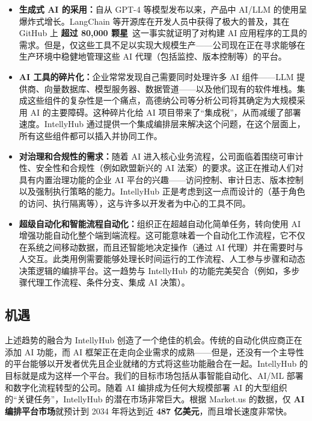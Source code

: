 \documentclass[11pt, a4paper, oneside]{article}
\begin{document}
\begin{itemize}
    \item \textbf{生成式 AI 的采用：}自从 GPT-4 等模型发布以来，产品中 AI/LLM 的使用呈爆炸式增长。LangChain 等开源库在开发人员中获得了极大的普及，其在 GitHub 上 \textbf{超过 80,000 颗星}~\cite{langchainGitHub}这一事实就证明了对构建 AI 应用程序的工具的需求。但是，仅这些工具不足以实现大规模生产——公司现在正在寻求能够在生产环境中稳健地管理这些 AI 代理（包括监控、版本控制等）的平台。

    \item \textbf{AI 工具的碎片化：}企业常常发现自己需要同时处理许多 AI 组件——LLM 提供商、向量数据库、模型服务器、数据管道——以及他们现有的软件堆栈。集成这些组件的复杂性是一个痛点，高德纳公司等分析公司将其确定为大规模采用 AI 的主要障碍\cite{gartnerAIBarriers}。这种碎片化给 AI 项目带来了“集成税”，从而减缓了部署速度。IntellyHub 通过提供一个集成编排层来解决这个问题，在这个层面上，所有这些组件都可以插入并协同工作。

    \item \textbf{对治理和合规性的需求：}随着 AI 进入核心业务流程，公司面临着围绕可审计性、安全性和合规性（例如欧盟新兴的 AI 法案\cite{euAIAct}）的要求。这正在推动人们对具有内置治理功能的企业 AI 平台的兴趣——访问控制、审计日志、版本控制以及强制执行策略的能力。IntellyHub 正是考虑到这一点而设计的（基于角色的访问、执行隔离等），这与许多以开发者为中心的工具不同。

    \item \textbf{超级自动化和智能流程自动化：}组织正在超越自动化简单任务，转向使用 AI 增强功能自动化整个端到端流程。这可能意味着一个自动化工作流程，它不仅在系统之间移动数据，而且还智能地决定操作（通过 AI 代理）并在需要时与人交互。此类用例需要能够处理长时间运行的工作流程、人工参与步骤和动态决策逻辑的编排平台。这一趋势与 IntellyHub 的功能完美契合（例如，多步骤代理工作流程、条件分支、集成 AI 决策）。
\end{itemize}

\subsection{机遇}

上述趋势的融合为 IntellyHub 创造了一个绝佳的机会。传统的自动化供应商正在添加 AI 功能，而 AI 框架正在走向企业需求的成熟——但是，还没有一个主导性的平台能够以开发者优先且企业就绪的方式将这些功能融合在一起。IntellyHub 的目标就是成为这样一个平台。我们的目标市场包括从事智能自动化、AI/ML 部署和数字化流程转型的公司。随着 AI 编排成为任何大规模部署 AI 的大型组织的“关键任务”，IntellyHub 的潜在市场非常巨大。根据 Market.us 的数据，仅 \textbf{AI 编排平台市场}就预计到 2034 年将达到近 \textbf{487 亿美元}\cite{AIOrch}，而且增长速度非常快。
\end{document}
